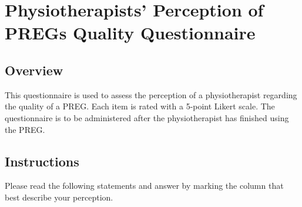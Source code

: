 \chapter{Physiotherapists' Perception of PREGs Quality Questionnaire}
\label{ap:physiotherapists_questionnaire}

\section*{Overview}
This questionnaire is used to assess the perception of a physiotherapist regarding the quality of a \ac{PREG}. Each item is rated with a 5-point Likert scale. The questionnaire is to be administered after the physiotherapist has finished using the \ac{PREG}.

\section*{Instructions}
Please read the following statements and answer by marking the column that best describe your perception.

